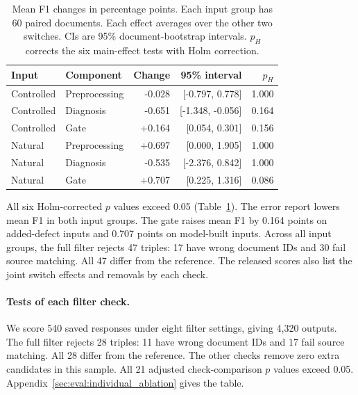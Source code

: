 \begin{table}[t]

\centering

\caption{Mean F1 changes in percentage points. Each input group has 60 paired documents. Each effect averages over the other two switches. CIs are 95\% document-bootstrap intervals. $p_H$ corrects the six main-effect tests with Holm correction.}
\label{tab:recovery_factorial}

\small

\begin{tabular}{llrrr}

\toprule

Input & Component & Change & 95\% interval & $p_H$ \\

\midrule

Controlled & Preprocessing & -0.028 & [-0.797, 0.778] & 1.000 \\

Controlled & Diagnosis & -0.651 & [-1.348, -0.056] & 0.164 \\

Controlled & Gate & +0.164 & [0.054, 0.301] & 0.156 \\

Natural & Preprocessing & +0.697 & [0.000, 1.905] & 1.000 \\

Natural & Diagnosis & -0.535 & [-2.376, 0.842] & 1.000 \\

Natural & Gate & +0.707 & [0.225, 1.316] & 0.086 \\

\bottomrule

\end{tabular}

\end{table}

All six Holm-corrected $p$ values exceed 0.05
(Table~\ref{tab:recovery_factorial}). The error report lowers mean F1
in both input groups. The gate raises mean F1 by 0.164 points on
added-defect inputs and 0.707 points on model-built inputs.
Across all input groups, the full filter rejects 47 triples:
17 have wrong document IDs and 30 fail source matching.
All 47 differ from the reference. The released scores also list the joint
switch effects and removals by each check.


\paragraph{Tests of each filter check.}
We score 540 saved responses under eight filter settings, giving 4,320
outputs. The full filter rejects 28 triples: 11 have wrong document IDs
and 17 fail source matching. All 28 differ from the reference.
The other checks remove zero extra candidates in this sample.
All 21 adjusted check-comparison $p$ values exceed 0.05.
Appendix~\ref{sec:eval:individual_ablation} gives the table.

